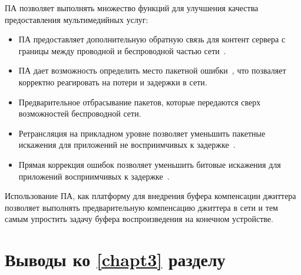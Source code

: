 ПА позволяет выполнять множество функций для улучшения качества предоставления мультимедийных услуг:
\begin{itemize}
\item ПА предоставляет дополнительную обратную связь для контент сервера с границы между проводной  и беспроводной частью сети \cite{SAdouble_feedback}.
\item ПА дает возможность определить место пакетной ошибки \cite{SAdouble_feedback}, что позваляет корректно реагировать на потери и задержки в сети.
\item Предварительное отбрасывание пакетов, которые передаются сверх возможностей беспроводной сети.
\item Ретрансляция на прикладном уровне позволяет уменьшить  пакетные искажения  для приложений не восприимчивых к задержке \cite{SArateOpt, SArealtime}.
\item Прямая коррекция ошибок позволяет уменьшить битовые искажения для приложений восприимчивых к задержке \cite{SArateOpt, SArealtime}.
\end{itemize}

Использование ПА, как платформу для внедрения буфера компенсации джиттера позволяет выполнять предварительную компенсацию джиттера в сети и тем самым упростить задачу буфера воспроизведения  на конечном устройстве.




\section{Выводы ко \ref{chapt3} разделу} \label{sect:concl3}

